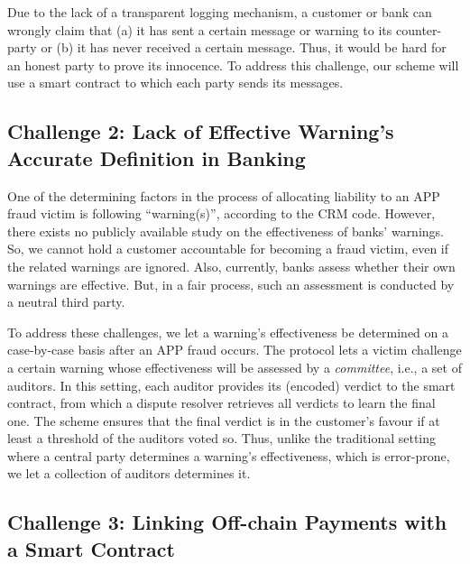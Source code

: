  Due to the lack of a transparent logging mechanism, a customer or bank can wrongly claim that (a) it has sent a certain message or warning to its counter-party or (b) it has never received a certain message.  Thus, it would be hard for an honest party to prove its innocence. To address this challenge, our scheme will use a  smart contract to which each party sends its messages.





\vspace{-1.1mm}
\subsection{Challenge 2: Lack of Effective Warning's Accurate Definition in Banking}\label{sec::Lack-of-Effective-Warning-Definition}


One of the determining factors in the process of allocating liability to an APP fraud victim is following ``warning(s)'', according to the CRM code. However, there exists no publicly available study on the effectiveness of banks' warnings. So, we cannot hold a customer accountable for becoming a fraud victim,  even if the related warnings are ignored. Also, currently,  banks assess whether their own warnings are effective. But, in a fair process, such an assessment is conducted by a neutral third party.  

To address these challenges, we let a warning's effectiveness be determined on a case-by-case basis after an APP fraud occurs. The protocol lets a victim challenge a certain warning whose effectiveness will be assessed by a \emph{committee}, i.e., a  set of auditors. In this setting, each auditor provides its (encoded) verdict to the smart contract, from which a dispute resolver retrieves all verdicts to learn the final one. The scheme ensures that the final verdict is in the customer's favour if at least a threshold of the auditors voted so. Thus, unlike the traditional setting where a central party determines a warning's effectiveness, which is error-prone, we let a collection of auditors determines it.



\vspace{-1.1mm}

\subsection{Challenge 3: Linking Off-chain Payments with a Smart Contract}\label{sec::Linking Off-chain-Payments-with-contract}

